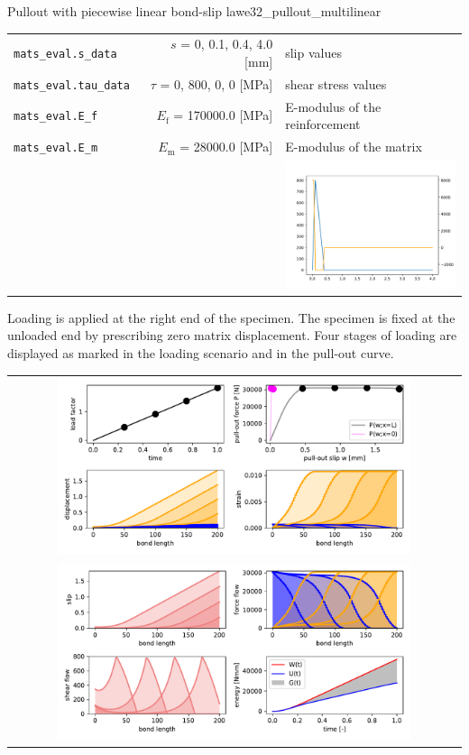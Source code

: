 \documentclass[main.tex]{subfiles}
\begin{document}
\begin{bmcsex}{Pullout with piecewise linear bond-slip law}{e32_pullout_multilinear}
\begin{center}
{\begin{longtable}{lrp{4cm}}
\texttt{mats\_eval.s\_data} & $s$ = 0, 0.1, 0.4, 4.0 [mm] & {\footnotesize slip values}  \\
            \texttt{mats\_eval.tau\_data} & $\tau$ = 0, 800, 0, 0 [MPa] & {\footnotesize shear stress values}  \\
            \texttt{mats\_eval.E\_f} & $E_\mathrm{f}$ = 170000.0 [MPa] & {\footnotesize E-modulus of the reinforcement}  \\
            \texttt{mats\_eval.E\_m} & $E_\mathrm{m}$ = 28000.0 [MPa] & {\footnotesize E-modulus of the matrix}  \\
            
\multicolumn{3}{r}{\includegraphics[width=5cm]{examples/e32_pullout_multilinear/fig_multilinear_bond_law.pdf}}\\
\bottomrule 
\end{longtable}
}

    Loading is applied at the right end of the specimen. The specimen
    is fixed at the unloaded end by prescribing zero matrix displacement. 
    Four stages of loading are displayed as marked in the
    loading scenario and in the pull-out curve.
    \begin{longtable}{c}
\mbox{
    \includegraphics[width=0.8\textwidth]{examples/e32_pullout_multilinear/fig_frictional_bond01.pdf}
    }\\
    
    \mbox{\includegraphics[width=0.8\textwidth]{examples/e32_pullout_multilinear/fig_frictional_bond02.pdf}}

    
    \end{longtable}
    \end{center}
            \end{bmcsex}
\end{document}
